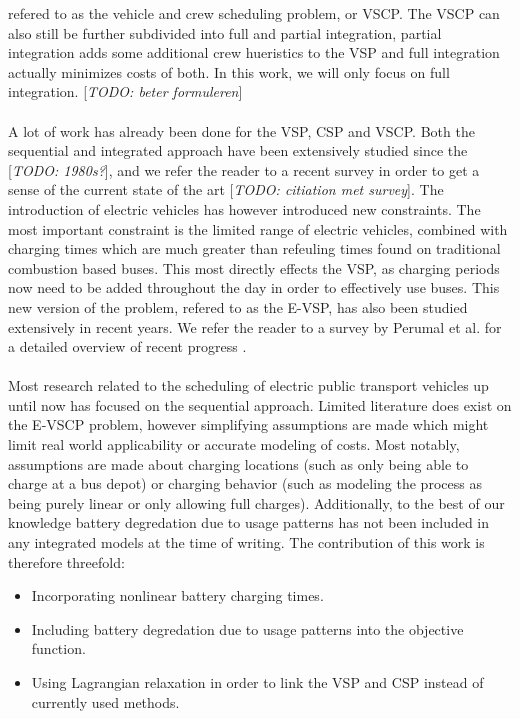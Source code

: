 \documentclass[ht]{article}
\newcommand{\todo}[1]{{\color{red}[\textit{TODO: #1}]}}
\begin{document}
refered to as the vehicle and crew scheduling problem, or VSCP. The VSCP can also still be further subdivided into full and partial integration, partial integration adds some additional crew hueristics to the VSP and full integration actually minimizes costs of both. In this work, we will only focus on full integration. \todo{beter formuleren} \\\\ 
A lot of work has already been done for the VSP, CSP and VSCP. Both the sequential and
integrated approach have been extensively studied since the \todo{1980s?}, and
we refer the reader to a recent survey in order to get a sense of the current
state of the art \todo{citiation met survey}. The introduction of electric
vehicles has however introduced new constraints. The most important constraint
is the limited range of electric vehicles, combined with charging times which are
much greater than refeuling times found on traditional combustion based buses. This most
directly effects the VSP, as charging periods now need to be added throughout
the day in order to effectively use buses. This new version of the problem,
refered to as the E-VSP, has also been studied extensively in recent years. We
refer the reader to a survey by Perumal et al. for a detailed overview of
recent progress \cite{Perumal2022LitRev}. \\\\ Most research related to the
scheduling of electric public transport vehicles up until now has focused on
the sequential approach. Limited literature does exist on the E-VSCP problem,
however simplifying assumptions are made which might limit real world
applicability or accurate modeling of costs. Most notably, assumptions are made
about charging locations (such as only being able to charge at a bus depot) or
charging behavior (such as modeling the process as being purely linear or only
allowing full charges). Additionally, to the best of our knowledge battery
degredation due to usage patterns has not been included in any integrated
models at the time of writing. The contribution of this work is therefore
threefold:
\begin{itemize}
  \item Incorporating nonlinear battery charging times.
  \item Including battery degredation due to usage patterns into the objective function.
  \item Using Lagrangian relaxation in order to link the VSP and CSP instead of currently used methods.
\end{itemize}
\end{document}
